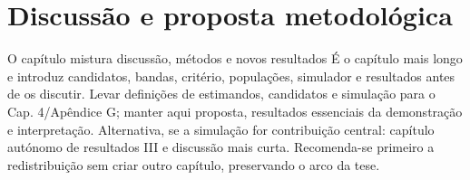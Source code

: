 
\chapter{Discussão e proposta metodológica}
\label{cha:discussao}
{O capítulo mistura discussão, métodos e novos resultados}
{É o capítulo mais longo e introduz candidatos, bandas, critério,
populações, simulador e resultados antes de os discutir. Levar definições
de estimandos, candidatos e simulação para o Cap. 4/Apêndice G; manter
aqui proposta, resultados essenciais da demonstração e interpretação.
Alternativa, se a simulação for contribuição central: capítulo autónomo
de resultados III e discussão mais curta. Recomenda-se primeiro a
redistribuição sem criar outro capítulo, preservando o arco da tese.}%

